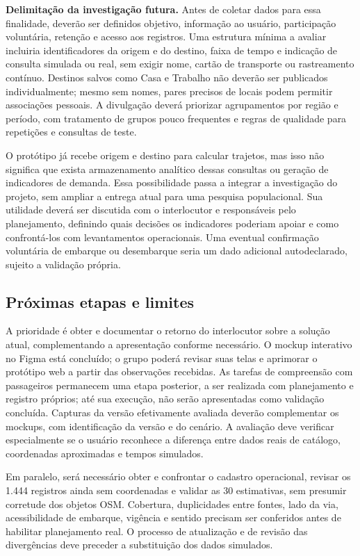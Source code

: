 \documentclass[12pt,oneside,a4paper,brazil]{abntex2}
\begin{document}
\textbf{Delimitação da investigação futura.} Antes de coletar dados para essa finalidade, deverão ser definidos objetivo, informação ao usuário, participação voluntária, retenção e acesso aos registros. Uma estrutura mínima a avaliar incluiria identificadores da origem e do destino, faixa de tempo e indicação de consulta simulada ou real, sem exigir nome, cartão de transporte ou rastreamento contínuo. Destinos salvos como Casa e Trabalho não deverão ser publicados individualmente; mesmo sem nomes, pares precisos de locais podem permitir associações pessoais. A divulgação deverá priorizar agrupamentos por região e período, com tratamento de grupos pouco frequentes e regras de qualidade para repetições e consultas de teste.

O protótipo já recebe origem e destino para calcular trajetos, mas isso não significa que exista armazenamento analítico dessas consultas ou geração de indicadores de demanda. Essa possibilidade passa a integrar a investigação do projeto, sem ampliar a entrega atual para uma pesquisa populacional. Sua utilidade deverá ser discutida com o interlocutor e responsáveis pelo planejamento, definindo quais decisões os indicadores poderiam apoiar e como confrontá-los com levantamentos operacionais. Uma eventual confirmação voluntária de embarque ou desembarque seria um dado adicional autodeclarado, sujeito a validação própria.

\subsection{Próximas etapas e limites}
A prioridade é obter e documentar o retorno do interlocutor sobre a solução atual, complementando a apresentação conforme necessário. O mockup interativo no Figma está concluído; o grupo poderá revisar suas telas e aprimorar o protótipo web a partir das observações recebidas. As tarefas de compreensão com passageiros permanecem uma etapa posterior, a ser realizada com planejamento e registro próprios; até sua execução, não serão apresentadas como validação concluída. Capturas da versão efetivamente avaliada deverão complementar os mockups, com identificação da versão e do cenário. A avaliação deve verificar especialmente se o usuário reconhece a diferença entre dados reais de catálogo, coordenadas aproximadas e tempos simulados.

Em paralelo, será necessário obter e confrontar o cadastro operacional, revisar os 1.444 registros ainda sem coordenadas e validar as 30 estimativas, sem presumir corretude dos objetos OSM. Cobertura, duplicidades entre fontes, lado da via, acessibilidade de embarque, vigência e sentido precisam ser conferidos antes de habilitar planejamento real. O processo de atualização e de revisão das divergências deve preceder a substituição dos dados simulados.
\end{document}
